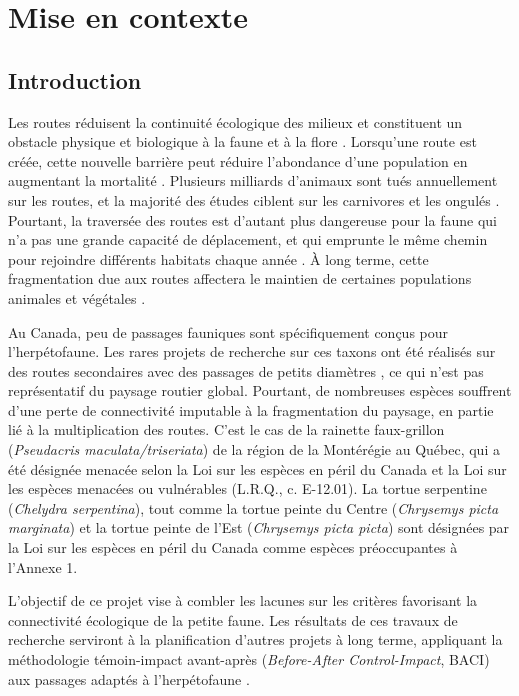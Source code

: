 
\section{Mise en contexte}

\subsection{Introduction}

Les routes réduisent la continuité écologique des milieux et constituent un obstacle physique et biologique à la faune et à la flore \citep{forman1998}. Lorsqu'une route est créée, cette nouvelle barrière peut réduire l'abondance d'une population en augmentant la mortalité \citep{seiler2020, rytwinski2016}. Plusieurs milliards d'animaux sont tués annuellement sur les routes, et la majorité des études ciblent sur les carnivores et les ongulés \citep{barrientos2021}. Pourtant, la traversée des routes est d'autant plus dangereuse pour la faune qui n'a pas une grande capacité de déplacement, et qui emprunte le même chemin pour rejoindre différents habitats chaque année \citep{gunson2019, jones2022, langen2009}. À long terme, cette fragmentation due aux routes affectera le maintien de certaines populations animales et végétales \citep{gonzalezgallina2013}.  

Au Canada, peu de passages fauniques sont spécifiquement conçus pour l'herpétofaune. Les rares projets de recherche sur ces taxons ont été réalisés sur des routes secondaires avec des passages de petits diamètres \citep{retamal2020}, ce qui n'est pas représentatif du paysage routier global. Pourtant, de nombreuses espèces souffrent d'une perte de connectivité imputable à la fragmentation du paysage, en partie lié à la multiplication des routes. C'est le cas de la rainette faux-grillon (\emph{Pseudacris maculata/triseriata}) de la région de la Montérégie au Québec, qui a été désignée menacée selon la Loi sur les espèces en péril du Canada \citep{cosepac2008} et la Loi sur les espèces menacées ou vulnérables (L.R.Q., c. E-12.01). La tortue serpentine (\emph{Chelydra serpentina}), tout comme la tortue peinte du Centre (\emph{Chrysemys picta marginata}) et la tortue peinte de l'Est (\emph{Chrysemys picta picta}) sont désignées par la Loi sur les espèces en péril du Canada comme espèces préoccupantes à l'Annexe 1.

L'objectif de ce projet vise à combler les lacunes sur les critères favorisant la connectivité écologique de la petite faune. Les résultats de ces travaux de recherche serviront à la planification d'autres projets à long terme, appliquant la méthodologie témoin-impact avant-après (\emph{Before-After Control-Impact}, BACI) aux passages adaptés à l'herpétofaune \citep{jones2022}.


